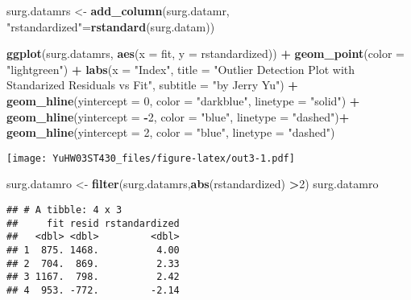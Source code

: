 \documentclass[
]{article}
\newenvironment{Shaded}{\begin{snugshade}}{\end{snugshade}}
\newcommand{\AttributeTok}[1]{\textcolor[rgb]{0.13,0.29,0.53}{#1}}
\newcommand{\DecValTok}[1]{\textcolor[rgb]{0.00,0.00,0.81}{#1}}
\newcommand{\FunctionTok}[1]{\textcolor[rgb]{0.13,0.29,0.53}{\textbf{#1}}}
\newcommand{\NormalTok}[1]{#1}
\newcommand{\OtherTok}[1]{\textcolor[rgb]{0.56,0.35,0.01}{#1}}
\newcommand{\SpecialCharTok}[1]{\textcolor[rgb]{0.81,0.36,0.00}{\textbf{#1}}}
\newcommand{\StringTok}[1]{\textcolor[rgb]{0.31,0.60,0.02}{#1}}
\begin{document}
\begin{Shaded}
\begin{Highlighting}[]
\NormalTok{surg.datamrs }\OtherTok{\textless{}{-}} \FunctionTok{add\_column}\NormalTok{(surg.datamr, }\StringTok{"rstandardized"}\OtherTok{=}\FunctionTok{rstandard}\NormalTok{(surg.datam))}

\FunctionTok{ggplot}\NormalTok{(surg.datamrs, }\FunctionTok{aes}\NormalTok{(}\AttributeTok{x =}\NormalTok{ fit, }\AttributeTok{y =}\NormalTok{ rstandardized)) }\SpecialCharTok{+}
  \FunctionTok{geom\_point}\NormalTok{(}\AttributeTok{color =} \StringTok{"lightgreen"}\NormalTok{) }\SpecialCharTok{+}
  \FunctionTok{labs}\NormalTok{(}\AttributeTok{x =} \StringTok{"Index"}\NormalTok{,}
       \AttributeTok{title =} \StringTok{"Outlier Detection Plot with Standarized Residuals vs Fit"}\NormalTok{,}
       \AttributeTok{subtitle =} \StringTok{"by Jerry Yu"}\NormalTok{) }\SpecialCharTok{+}
  \FunctionTok{geom\_hline}\NormalTok{(}\AttributeTok{yintercept =} \DecValTok{0}\NormalTok{,}
             \AttributeTok{color =} \StringTok{"darkblue"}\NormalTok{,}
             \AttributeTok{linetype =} \StringTok{"solid"}\NormalTok{) }\SpecialCharTok{+}
    \FunctionTok{geom\_hline}\NormalTok{(}\AttributeTok{yintercept =} \SpecialCharTok{{-}}\DecValTok{2}\NormalTok{,}
             \AttributeTok{color =} \StringTok{"blue"}\NormalTok{,}
             \AttributeTok{linetype =} \StringTok{"dashed"}\NormalTok{)}\SpecialCharTok{+}
  \FunctionTok{geom\_hline}\NormalTok{(}\AttributeTok{yintercept =} \DecValTok{2}\NormalTok{,}
             \AttributeTok{color =} \StringTok{"blue"}\NormalTok{,}
             \AttributeTok{linetype =} \StringTok{"dashed"}\NormalTok{)}
\end{Highlighting}
\end{Shaded}

\texttt{[image: YuHW03ST430\_files/figure-latex/out3-1.pdf]}

\begin{Shaded}
\begin{Highlighting}[]
\NormalTok{surg.datamro }\OtherTok{\textless{}{-}} \FunctionTok{filter}\NormalTok{(surg.datamrs,}\FunctionTok{abs}\NormalTok{(rstandardized) }\SpecialCharTok{\textgreater{}}\DecValTok{2}\NormalTok{)}
\NormalTok{surg.datamro}
\end{Highlighting}
\end{Shaded}

\begin{verbatim}
## # A tibble: 4 x 3
##     fit resid rstandardized
##   <dbl> <dbl>         <dbl>
## 1  875. 1468.          4.00
## 2  704.  869.          2.33
## 3 1167.  798.          2.42
## 4  953. -772.         -2.14
\end{verbatim}
\end{document}
